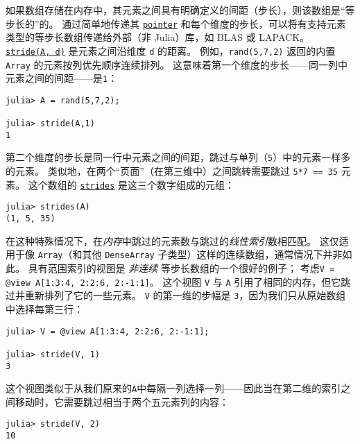 如果数组存储在内存中，其元素之间具有明确定义的间距（步长），则该数组是“等步长的”的。 通过简单地传递其 \hyperlink{8901246211940014300}{\texttt{pointer}} 和每个维度的步长，可以将有支持元素类型的等步长数组传递给外部（非 Julia）库，如 BLAS 或 LAPACK。 \hyperlink{97811245619734938}{\texttt{stride(A, d)}} 是元素之间沿维度 \texttt{d} 的距离。 例如，\texttt{rand(5,7,2)} 返回的内置 \texttt{Array} 的元素按列优先顺序连续排列。 这意味着第一个维度的步长——同一列中元素之间的间距——是\texttt{1}：




\begin{verbatim}
julia> A = rand(5,7,2);

julia> stride(A,1)
1
\end{verbatim}



第二个维度的步长是同一行中元素之间的间距，跳过与单列（\texttt{5}）中的元素一样多的元素。 类似地，在两个“页面”（在第三维中）之间跳转需要跳过 \texttt{5*7 == 35} 元素。 这个数组的 \hyperlink{13576557637670855932}{\texttt{strides}} 是这三个数字组成的元组：




\begin{verbatim}
julia> strides(A)
(1, 5, 35)
\end{verbatim}



在这种特殊情况下，在\emph{内存}中跳过的元素数与跳过的\emph{线性索引}数相匹配。 这仅适用于像 \texttt{Array}（和其他 \texttt{DenseArray} 子类型）这样的连续数组，通常情况下并非如此。 具有范围索引的视图是 \emph{非连续} 等步长数组的一个很好的例子； 考虑\texttt{V = @view A[1:3:4, 2:2:6, 2:-1:1]}。 这个视图 \texttt{V} 与 \texttt{A} 引用了相同的内存，但它跳过并重新排列了它的一些元素。 \texttt{V} 的第一维的步幅是 \texttt{3}，因为我们只从原始数组中选择每第三行：




\begin{verbatim}
julia> V = @view A[1:3:4, 2:2:6, 2:-1:1];

julia> stride(V, 1)
3
\end{verbatim}



这个视图类似于从我们原来的\texttt{A}中每隔一列选择一列——因此当在第二维的索引之间移动时，它需要跳过相当于两个五元素列的内容：




\begin{verbatim}
julia> stride(V, 2)
10
\end{verbatim}



